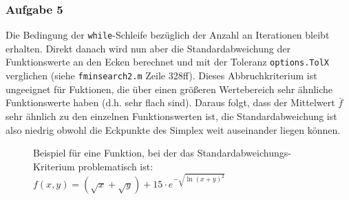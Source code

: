 \documentclass[a4paper, 12pt]{report}
\begin{document}
\subsubsection{Aufgabe 5}
Die Bedingung der \lstinline[basicstyle=\ttfamily\color{black}]|while|-Schleife bezüglich der Anzahl an Iterationen bleibt
erhalten. Direkt danach wird nun aber die Standardabweichung der Funktionswerte an den Ecken berechnet und mit der Toleranz
\lstinline[basicstyle=\ttfamily\color{black}]|options.TolX| verglichen (siehe
\lstinline[basicstyle=\ttfamily\color{black}]|fminsearch2.m| Zeile 328ff). Dieses Abbruchkriterium ist ungeeignet für Fuktionen,
die über einen größeren Wertebereich sehr ähnliche Funktionswerte haben (d.h. sehr flach sind). Daraus folgt, dass der Mittelwert
$\bar f$ sehr ähnlich zu den einzelnen Funktionswerten ist, die Standardabweichung ist also niedrig obwohl die Eckpunkte des Simplex
weit auseinander liegen können.
\begin{figure}[H]
  \centering
  \caption{Beispiel für eine Funktion, bei der das Standardabweichungs-Kriterium problematisch ist: $f(x,y) = (\sqrt{x} + \sqrt{y}) + 15\cdot e^{-\sqrt{\ln(x+y)^2}}$}
\end{figure}
\end{document}
